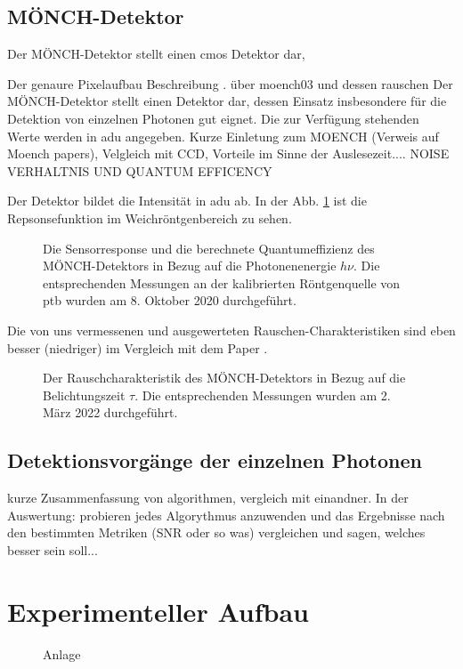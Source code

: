 \section{MÖNCH-Detektor}
Der MÖNCH-Detektor stellt einen \gls{cmos} Detektor dar,

\noindent
Der genaure Pixelaufbau Beschreibung \cite{dinapoli_monch_2014}. über moench03 und dessen rauschen \cite{ramilli_measurements_2017}
Der MÖNCH-Detektor stellt einen Detektor dar, dessen Einsatz insbesondere für die Detektion von einzelnen Photonen gut eignet. Die zur Verfügung stehenden Werte werden in \gls{adu} angegeben. \cite{bergamaschi_monch_2018}
Kurze Einletung zum MOENCH (Verweis auf Moench papers), Velgleich mit CCD, Vorteile 
im Sinne der Auslesezeit.... NOISE VERHALTNIS  UND QUANTUM EFFICENCY

Der Detektor bildet die Intensität in \gls{adu} ab. In der Abb. \ref{fig:response_moench} ist die Repsonsefunktion im Weichröntgenbereich zu sehen. 
\begin{figure}[H]
    \centering
    
    \caption{Die Sensorresponse und die berechnete Quantumeffizienz des MÖNCH-Detektors in Bezug auf die Photonenenergie $h\nu$. Die entsprechenden Messungen an der kalibrierten Röntgenquelle von \gls{ptb} wurden am 8. Oktober 2020 durchgeführt.}
    \label{fig:response_moench}
\end{figure}
Die von uns vermessenen und ausgewerteten Rauschen-Charakteristiken sind eben besser (niedriger) im Vergleich mit dem Paper \cite{ramilli_measurements_2017}.
\begin{figure}[H]
    \centering
    
    \caption{Der Rauschcharakteristik des MÖNCH-Detektors in Bezug auf die Belichtungszeit $\tau$. Die entsprechenden Messungen wurden am 2. März 2022 durchgeführt.}
    \label{fig:noise_moench}
\end{figure}
\section{Detektionsvorgänge der einzelnen Photonen}
\label{text:single_photon_theorie}
kurze Zusammenfassung von algorithmen, vergleich mit einandner. In der Auswertung: probieren jedes Algorythmus anzuwenden und das Ergebnisse nach den bestimmten Metriken (SNR oder so was) vergleichen und sagen, welches besser sein soll...

\chapter{Experimenteller Aufbau}
\begin{figure}[H]
    \centering
    
    \caption{Anlage}
    \label{fig:anlage}
\end{figure}
